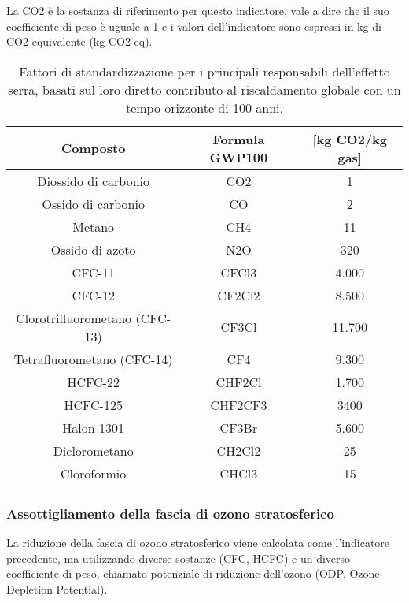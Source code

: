 La CO2 è la sostanza di riferimento per questo indicatore, vale a dire che il suo coefficiente di peso è uguale a 1 e i valori dell'indicatore sono espressi in kg di CO2 equivalente (kg CO2 eq).
\begin{table}[!ht]
    \centering
    \begin{tabular}{|| c | c | c ||} %
        \hline
        \textbf{Composto} &\textbf{Formula	GWP100} & \textbf{[kg CO2/kg gas]}\\
        \hline\hline
        Diossido di carbonio &	CO2	& 1 \\
        \hline
        Ossido di carbonio & CO &	2\\
        \hline
        Metano	& CH4	& 11\\
        \hline
        Ossido di azoto	& N2O	& 320\\
        \hline
        CFC-11	& CFCl3	& 4.000\\
        \hline
        CFC-12	& CF2Cl2	& 8.500\\
        \hline
        Clorotrifluorometano (CFC-13)	& CF3Cl	& 11.700\\
        \hline
        Tetrafluorometano (CFC-14)	& CF4	& 9.300\\
        \hline
        HCFC-22	& CHF2Cl	& 1.700\\
        \hline
        HCFC-125	& CHF2CF3	& 3400\\
        \hline
        Halon-1301	& CF3Br	& 5.600\\
        \hline
        Diclorometano	& CH2Cl2	& 25\\
        \hline
        Cloroformio	& CHCl3	& 15\\
        \hline
    \end{tabular}
    \caption{Fattori di standardizzazione per i principali responsabili dell'effetto serra, basati sul loro diretto contributo al riscaldamento globale con un tempo-orizzonte di 100 anni.}
    \label{tabellaFattoriEffettoSerra}
\end{table}
	 


\subsubsection*{Assottigliamento della fascia di ozono stratosferico}
La riduzione della fascia di ozono stratosferico viene calcolata come l'indicatore precedente, ma utilizzando diverse sostanze (CFC, HCFC) e un diverso coefficiente di peso, chiamato potenziale di riduzione dell'ozono (ODP, Ozone Depletion Potential).

